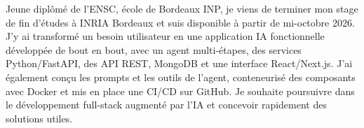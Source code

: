 
\begin{cvparagraph}
Jeune diplômé de l’ENSC, école de Bordeaux INP, je viens de terminer mon stage de fin d’études à INRIA Bordeaux et suis disponible à partir de mi-octobre 2026. J’y ai transformé un besoin utilisateur en une application IA fonctionnelle développée de bout en bout, avec un agent multi-étapes, des services Python/FastAPI, des API REST, MongoDB et une interface React/Next.js. J’ai également conçu les prompts et les outils de l’agent, conteneurisé des composants avec Docker et mis en place une CI/CD sur GitHub. Je souhaite poursuivre dans le développement full-stack augmenté par l’IA et concevoir rapidement des solutions utiles.
\end{cvparagraph}
